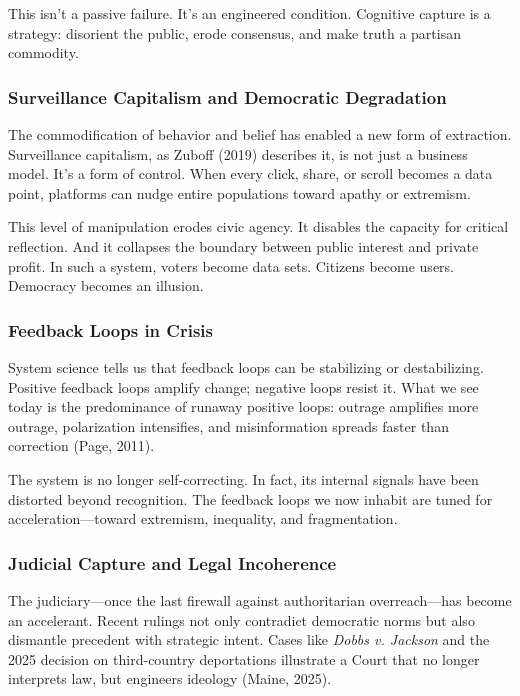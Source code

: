 \documentclass[
]{article}
\begin{document}
This isn't a passive failure. It's an engineered condition. Cognitive capture is a strategy: disorient the public, erode consensus, and make truth a partisan commodity.

\subsubsection{Surveillance Capitalism and Democratic Degradation}\label{surveillance-capitalism-and-democratic-degradation}

The commodification of behavior and belief has enabled a new form of extraction. Surveillance capitalism, as Zuboff (2019) describes it, is not just a business model. It's a form of control. When every click, share, or scroll becomes a data point, platforms can nudge entire populations toward apathy or extremism.

This level of manipulation erodes civic agency. It disables the capacity for critical reflection. And it collapses the boundary between public interest and private profit. In such a system, voters become data sets. Citizens become users. Democracy becomes an illusion.

\subsubsection{Feedback Loops in Crisis}\label{feedback-loops-in-crisis}

System science tells us that feedback loops can be stabilizing or destabilizing. Positive feedback loops amplify change; negative loops resist it. What we see today is the predominance of runaway positive loops: outrage amplifies more outrage, polarization intensifies, and misinformation spreads faster than correction (Page, 2011).

The system is no longer self-correcting. In fact, its internal signals have been distorted beyond recognition. The feedback loops we now inhabit are tuned for acceleration---toward extremism, inequality, and fragmentation.

\subsubsection{Judicial Capture and Legal Incoherence}\label{judicial-capture-and-legal-incoherence}

The judiciary---once the last firewall against authoritarian overreach---has become an accelerant. Recent rulings not only contradict democratic norms but also dismantle precedent with strategic intent. Cases like \emph{Dobbs v. Jackson} and the 2025 decision on third-country deportations illustrate a Court that no longer interprets law, but engineers ideology (Maine, 2025).
\end{document}
